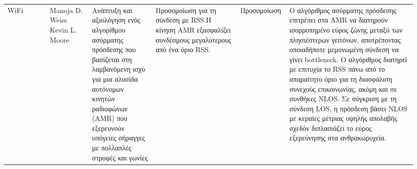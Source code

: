 \begin{landscape}
\begin{longtable}{p{0.1\linewidth}p{0.1\linewidth}p{0.15\linewidth}p{0.20\linewidth}p{0.1\linewidth}p{0.3\linewidth}}
        \hline
        WiFi & Manoja D. Weiss Kevin L. Moore \cite{weiss_autonomous_2009}&
        Ανάπτυξη και αξιολόγηση ενός αλγορίθμου ασύρματης πρόσδεσης που βασίζεται στη λαμβανόμενη ισχύ
        για μια αλυσίδα αυτόνομων κινητών ραδιοφώνων (AMR) που εξερευνούν υπόγειες σήραγγες
        με πολλαπλές στροφές και γωνίες&
        Προσομοίωση για τη σύνδεση με RSS.Η κίνηση AMR εξασφαλίζει συνδέσμους μεγαλύτερους από ένα όριο RSS.
        & Προσομοίωση &
        Ο αλγόριθμος ασύρματης πρόσδεσης επιτρέπει στα AMR να διατηρούν ισορροπημένο εύρος ζώνης μεταξύ των
        πλησιέστερων γειτόνων, αποτρέποντας οποιαδήποτε μεμονωμένη σύνδεση να γίνει bottleneck. Ο αλγόριθμος 
        διατηρεί με επιτυχία το RSS πάνω από το απαραίτητο όριο για τη διασφάλιση συνεχούς επικοινωνίας, ακόμη
        και σε συνθήκες NLOS. Σε σύγκριση με τη σύνδεση LOS, η πρόσδεση βάσει NLOS με κεραίες μέτριας υψηλής 
        απολαβής σχεδόν διπλασιάζει το εύρος εξερεύνησης στα ανθρακωρυχεία.\\


\end{longtable}
\end{landscape}
